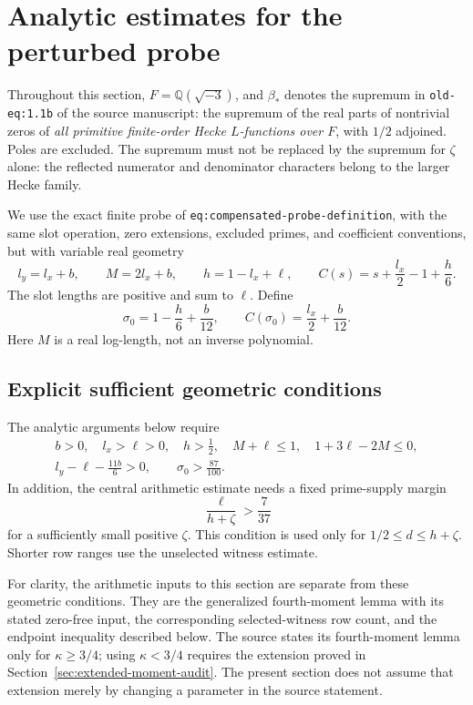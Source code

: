 \documentclass[11pt,a4paper]{article}
\numberwithin{equation}{section}
\theoremstyle{remark}
\begin{document}
\section{Analytic estimates for the perturbed probe}
\label{sec:analytic-audit}
\label{app:analytic-audit}

Throughout this section, \(F=\mathbb Q(\sqrt{-3})\), and \(\beta_*\)
denotes the supremum in \texttt{old-eq:1.1b} of the source manuscript:
the supremum of the real parts of nontrivial zeros of \emph{all primitive
finite-order Hecke \(L\)-functions over \(F\)}, with \(1/2\) adjoined.
Poles are excluded.  The supremum must not be replaced by the supremum
for \(\zeta\) alone: the reflected numerator and denominator characters
belong to the larger Hecke family.

We use the exact finite probe of
\texttt{eq:compensated-probe-definition}, with the same slot operation,
zero extensions, excluded primes, and coefficient conventions, but with
variable real geometry
\[
 l_y=l_x+b,\qquad M=2l_x+b,\qquad
 h=1-l_x+\ell,\qquad
 C(s)=s+\frac{l_x}{2}-1+\frac h6.
\]
The slot lengths are positive and sum to \(\ell\).
Define
\[
 \sigma_0=1-\frac h6+\frac b{12},\qquad
 C(\sigma_0)=\frac{l_x}{2}+\frac b{12}.
\]
Here \(M\) is a real log-length, not an inverse polynomial.

\subsection{Explicit sufficient geometric conditions}

The analytic arguments below require
\begin{equation}
\begin{gathered}
 b>0,\quad l_x>\ell>0,\quad h>\tfrac12,\quad
 M+\ell\le1,\quad 1+3\ell-2M\le0,\\
 l_y-\ell-\frac{11b}{6}>0,\qquad \sigma_0>\frac{87}{100}.
\end{gathered}
\label{eq:audit-geometric-conditions}
\end{equation}
In addition, the central arithmetic estimate needs a fixed prime-supply
margin
\begin{equation}
 \frac{\ell}{h+\zeta}>\frac7{37}
 \label{eq:audit-supply}
\end{equation}
for a sufficiently small positive \(\zeta\).  This condition is used only
for \(1/2\le d\le h+\zeta\).  Shorter row ranges use the unselected
witness estimate.

For clarity, the arithmetic inputs to this section are separate from
these geometric conditions.  They are the generalized fourth-moment
lemma with its stated zero-free input, the corresponding selected-witness
row count, and the endpoint inequality described below.  The source
states its fourth-moment lemma only for \(\kappa\ge3/4\); using
\(\kappa<3/4\) requires the extension proved in Section~\ref{sec:extended-moment-audit}.
The present section does not assume that extension merely by changing
a parameter in the source statement.
\end{document}
